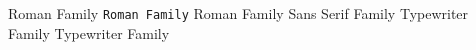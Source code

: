 \documentclass{article}
\begin{document}
  \textrm{Roman Family}
  \texttt{Roman Family}
  \rmfamily Roman Family {\sffamily Sans Serif Family} {\ttfamily Typewriter Family}
  {\ttfamily Typewriter Family}
\end{document}
